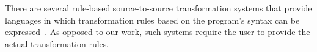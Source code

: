 \documentclass[sigconf,review,anonymous]{acmart}
\begin{document}





There are several rule-based source-to-source transformation systems that
provide languages in which transformation rules based on the program's
syntax can be expressed~\cite{stratego,txl}.  As opposed to our work, such
systems require the user to provide the actual transformation rules.

\end{document}
